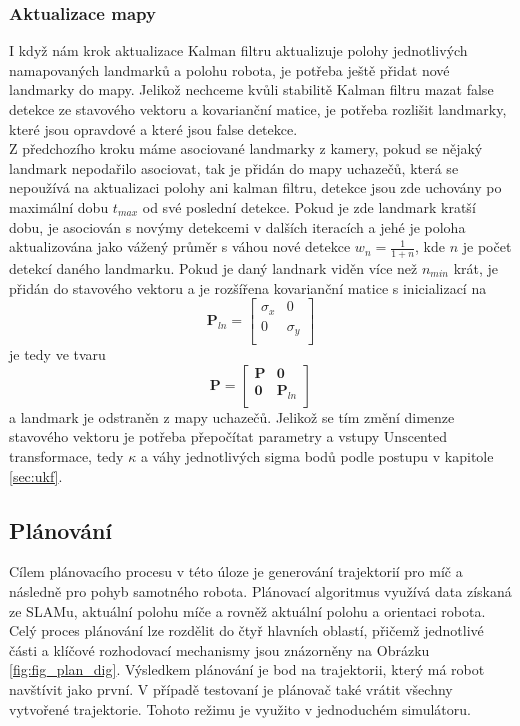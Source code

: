 \documentclass[a4paper,12pt]{article}
\begin{document}
\subsubsection{Aktualizace mapy}
\label{sec:update_map}
I když nám krok aktualizace Kalman filtru aktualizuje polohy jednotlivých namapovaných landmarků a polohu robota, je potřeba ještě přidat nové landmarky do mapy.
Jelikož nechceme kvůli stabilitě Kalman filtru mazat false detekce ze stavového vektoru a kovarianční matice, 
je potřeba rozlišit landmarky, které jsou opravdové a které jsou false detekce.\\
Z předchozího kroku máme asociované landmarky z kamery, pokud se nějaký landmark nepodařilo asociovat, tak je přidán do mapy uchazečů, 
která se nepoužívá na aktualizaci polohy ani kalman filtru, detekce jsou zde uchovány po maximální dobu $t_{max}$ od své poslední detekce. 
Pokud je zde landmark kratší dobu, je asociován s novýmy detekcemi v dalších iteracích a jehé je poloha aktualizována jako vážený průměr s váhou nové detekce $w_n = \frac{1}{1 + n}$, kde $n$ je počet detekcí daného landmarku.
Pokud je daný landnark viděn více než $n_{min}$ krát, je přidán do stavového vektoru a je rozšířena kovarianční matice s inicializací na 
\[
\mathbf P_{ln} = \begin{bmatrix}
    \sigma_{x} & 0 \\
    0 & \sigma_{y} \\
\end{bmatrix}
\]
je tedy ve tvaru 
\[
\mathbf P =
\begin{bmatrix}
    \mathbf P & \mathbf 0 \\
    \mathbf 0 & \mathbf P_{ln} \\
\end{bmatrix}
\]
a landmark je odstraněn z mapy uchazečů.
Jelikož se tím změní dimenze stavového vektoru je potřeba přepočítat parametry a vstupy Unscented transformace, tedy $\kappa$ a váhy jednotlivých sigma bodů podle postupu v kapitole \ref{sec:ukf}.\\


\subsection{Plánování}
Cílem plánovacího procesu v této úloze je generování trajektorií pro míč a následně pro pohyb samotného robota. Plánovací algoritmus využívá data získaná ze SLAMu, aktuální polohu míče a rovněž aktuální polohu a orientaci robota. Celý proces plánování lze rozdělit do čtyř hlavních oblastí, přičemž jednotlivé části a klíčové rozhodovací mechanismy jsou znázorněny na Obrázku \ref{fig:fig_plan_dig}. Výsledkem plánování je bod na trajektorii, který má robot navštívit jako první. V případě testovaní je plánovač také vrátit všechny vytvořené trajektorie. Tohoto režimu je využito v jednoduchém simulátoru. 
\end{document}
